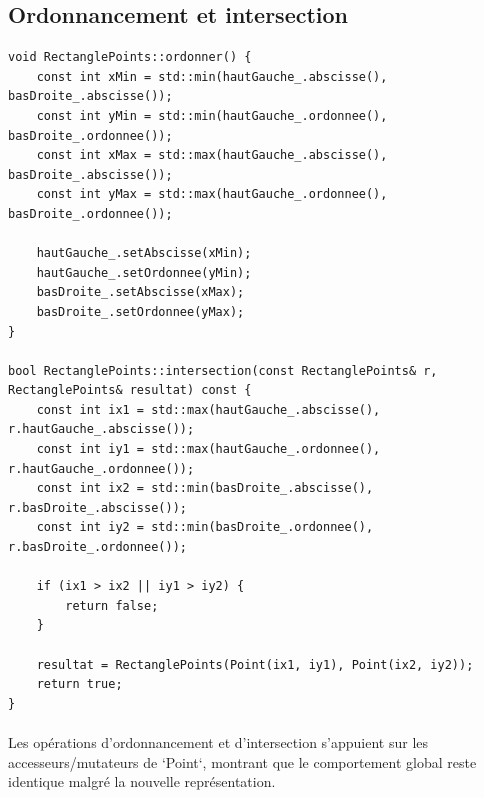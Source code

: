 \documentclass[12pt,a4paper]{article}
\begin{document}
\subsection{Ordonnancement et intersection}
\begin{lstlisting}[style=cppstyle]
void RectanglePoints::ordonner() {
    const int xMin = std::min(hautGauche_.abscisse(), basDroite_.abscisse());
    const int yMin = std::min(hautGauche_.ordonnee(), basDroite_.ordonnee());
    const int xMax = std::max(hautGauche_.abscisse(), basDroite_.abscisse());
    const int yMax = std::max(hautGauche_.ordonnee(), basDroite_.ordonnee());

    hautGauche_.setAbscisse(xMin);
    hautGauche_.setOrdonnee(yMin);
    basDroite_.setAbscisse(xMax);
    basDroite_.setOrdonnee(yMax);
}

bool RectanglePoints::intersection(const RectanglePoints& r, RectanglePoints& resultat) const {
    const int ix1 = std::max(hautGauche_.abscisse(), r.hautGauche_.abscisse());
    const int iy1 = std::max(hautGauche_.ordonnee(), r.hautGauche_.ordonnee());
    const int ix2 = std::min(basDroite_.abscisse(), r.basDroite_.abscisse());
    const int iy2 = std::min(basDroite_.ordonnee(), r.basDroite_.ordonnee());

    if (ix1 > ix2 || iy1 > iy2) {
        return false;
    }

    resultat = RectanglePoints(Point(ix1, iy1), Point(ix2, iy2));
    return true;
}
\end{lstlisting}

\paragraph{}
Les opérations d'ordonnancement et d'intersection s'appuient sur les accesseurs/mutateurs de `Point`, montrant que le comportement global reste identique malgré la nouvelle représentation.
\end{document}
